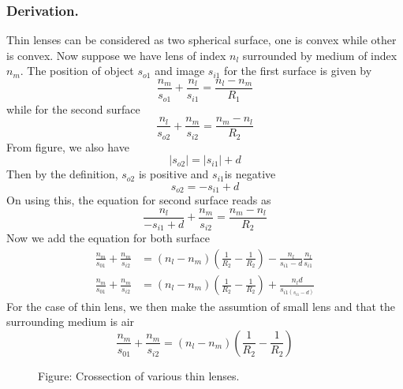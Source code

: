 \documentclass[../../../main.tex]{subfiles}
\begin{document}
\subsubsection{Derivation.} Thin lenses can be considered as two spherical surface, one is convex while other is convex. Now suppose we have lens of index $n_l$ surrounded by medium of index $n_m$. The position of object $s_{o1}$ and image $s_{i1}$ for the first surface is given by 
\begin{equation*}
    \frac{n_m}{s_{o1}}+\frac{n_l}{s_{i1}}=\frac{n_l-n_m}{R_1}
\end{equation*}
while for the second surface 
\begin{equation*}
    \frac{n_l}{s_{o2}}+\frac{n_m}{s_{i2}}=\frac{n_m-n_l}{R_2}
\end{equation*}
From figure, we also have 
\begin{equation*}
    |s_{o2}|=|s_{i1}|+d
\end{equation*}
Then by the definition, $s_{o2}$ is positive and $s_{i1}$is negative
\begin{equation*}
    s_{o2} =-s_{i1}+d
\end{equation*}
On using this, the equation for second surface reads as 
\begin{equation*}
    \frac{n_l}{-s_{i1}+d}+\frac{n_m}{s_{i2}}=\frac{n_m-n_l}{R_2}
\end{equation*}
Now we add the equation for both surface 
\begin{align*}
    \frac{n_m}{s_{01}}+\frac{n_m}{s_{i2}}&=(n_l-n_m)\left(\frac{1}{R_2}-\frac{1}{R_2}\right)-\frac{n_l}{s_{i1}-d}\frac{n_l}{s_{i1}}\\
    \frac{n_m}{s_{01}}+\frac{n_m}{s_{i2}}&=(n_l-n_m)\left(\frac{1}{R_2}-\frac{1}{R_2}\right)+\frac{n_l d}{s_{i1(s_{i1}-d)}}
\end{align*}
For the case of thin lens, we then make the assumtion of small lens and that the surrounding medium is air 
\begin{equation*}
    \frac{n_m}{s_{01}}+\frac{n_m}{s_{i2}}=(n_l-n_m)\left(\frac{1}{R_2}-\frac{1}{R_2}\right)
\end{equation*}

\begin{figure}
    \centering
    \caption*{Figure: Crossection of various thin lenses.}
\end{figure}
\end{document}

